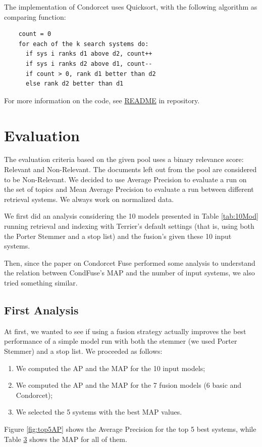     The implementation of Condorcet uses Quicksort, with the following algorithm
	as comparing function:

	\begin{lstlisting}
	count = 0
	for each of the k search systems do:
	  if sys i ranks d1 above d2, count++
	  if sys i ranks d2 above d1, count--
	  if count > 0, rank d1 better than d2
	  else rank d2 better than d1
	\end{lstlisting}
	
	For more information on the code, see \href{https://github.com/annabonaldo/IRCondorcetFuse/blob/master/README.md}{README} in repository.

    \section{Evaluation}

	The evaluation criteria based on the given pool uses a binary relevance score:
	Relevant and Non-Relevant.
	The documents left out from the pool are considered to be Non-Relevant.
	We decided to use Average Precision to evaluate a run on the set of topics and Mean Average Precision to evaluate a run between different retrieval systems. We always work on normalized data.
	
	We first did an analysis considering the 10 models presented in Table \ref{tab:10Mod} running retrieval and indexing with Terrier's default settings (that is, using both the Porter Stemmer and a stop list) and the fusion's given these 10 input systems.
	
	Then, since the paper on Condorcet Fuse performed some analysis to understand the relation between CondFuse's MAP and the number of input systems, we also tried something similar. 
	
	\subsection{First Analysis}
	At first, we wanted to see if using a fusion strategy actually improves the best performance of a simple model run with both the stemmer (we used Porter Stemmer) and a stop list.
	We proceeded as follows:
	\begin{enumerate}
		\item We computed the AP and the MAP for the 10 input models;
		\item We computed the AP and the MAP for the 7 fusion models (6 basic and Condorcet);
		\item We selected the 5 systems with the best MAP values.
	\end{enumerate}
	Figure \ref{fig:top5AP} shows the Average Precision for the top 5 best systems, while Table \hyperref[tab:17SysMAP]{3} shows the MAP for all of them.
	
